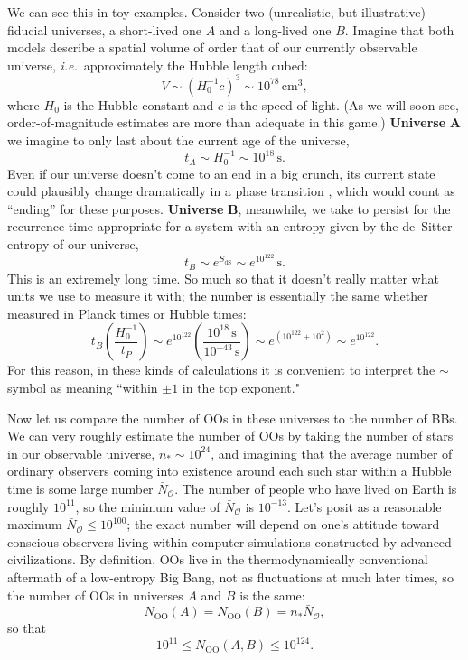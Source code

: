 \documentclass[12pt,letterpaper]{article}
\newcommand{\be}{\begin{equation}}
\newcommand{\ee}{\end{equation}}
\newcommand{\calo}{{\mathcal O}}
\newcommand{\dS}{{\mathrm{dS}}}
\newcommand{\OO}{{\mathrm{OO}}}
\begin{document}
We can see this in toy examples.
Consider two (unrealistic, but illustrative) fiducial universes, a short-lived one $A$ and a long-lived one $B$.
Imagine that both models describe a spatial volume of order that of our currently observable universe, \emph{i.e.}\ approximately the Hubble length cubed:
\be
  V \sim (H_0^{-1}c)^3 \sim 10^{78}\, \mathrm{cm}^3,
\ee
where $H_0$ is the Hubble constant and $c$ is the speed of light.
(As we will soon see, order-of-magnitude estimates are more than adequate in this game.)
{\bf Universe} $\boldsymbol A$ we imagine to only last about the current age of the universe,
\be
  t_A \sim H_0^{-1} \sim 10^{18} \, \mathrm{s}.
\ee
Even if our universe doesn't come to an end in a big crunch, its current state could plausibly change dramatically in a phase transition \cite{Page:2006dt,Page:2009mc}, which would count as ``ending'' for these purposes.
{\bf Universe} $\boldsymbol B$, meanwhile, we take to persist for the recurrence time appropriate for a system with an entropy given by the de~Sitter entropy of our universe, 
\be
  t_B \sim e^{S_{\dS}} \sim e^{10^{122}}\, \mathrm{s}.
\ee
This is an extremely long time.
So much so that it doesn't really matter what units we use to measure it with; the number is essentially the same whether measured in Planck times or Hubble times:
\be
  t_B\left(\frac{H_0^{-1}}{t_P}\right) \sim e^{10^{122}}\left(\frac{10^{18} \, \mathrm{s}}{10^{-43} \, \mathrm{s}}\right) 
  \sim e^{(10^{122} + 10^2)} \sim e^{10^{122}}.
\ee
For this reason, in these kinds of calculations it is convenient to interpret the $\sim$ symbol as meaning ``within $\pm 1$ in the top exponent."

Now let us compare the number of OOs in these universes to the number of BBs. 
We can very roughly estimate the number of OOs by taking the number of stars in our observable universe, $n_*\sim 10^{24}$, and imagining that the average number of ordinary observers coming into existence around each such star within a Hubble time is some large number $\bar{N}_\calo$.
The number of people who have lived on Earth is roughly $10^{11}$, so the minimum value of $\bar{N}_\calo$ is $10^{-13}$.
Let's posit as a reasonable maximum $\bar{N}_\calo \leq 10^{100}$; the exact number will depend on one's attitude toward conscious observers living within computer simulations constructed by advanced civilizations.
By definition, OOs live in the thermodynamically conventional aftermath of a low-entropy Big Bang, not as fluctuations at much later times, so the number of OOs in universes $A$ and $B$ is the same:
\be
  N_\OO(A) = N_\OO(B) = n_* \bar{N}_\calo,
\ee
so that
\be
  10^{11} \leq N_\OO(A,B) \leq 10^{124}.
  \label{noo}
\ee
\end{document}
